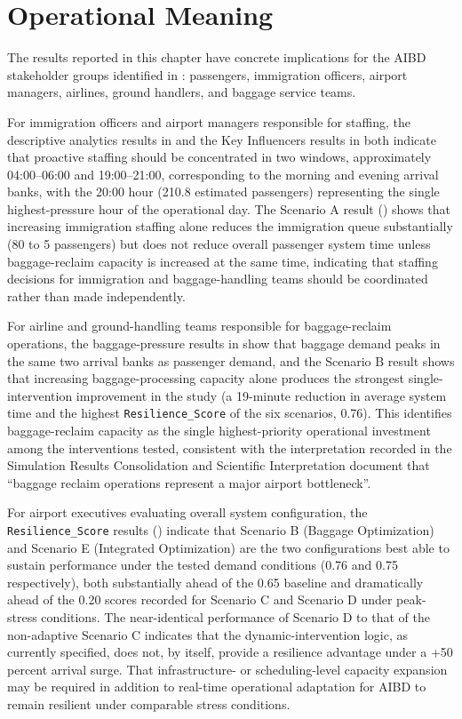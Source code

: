\section{Operational Meaning}
\label{sec:operational-meaning}

The results reported in this chapter have concrete implications for the AIBD stakeholder groups identified in : passengers, immigration officers, airport managers, airlines, ground handlers, and baggage service teams.

For immigration officers and airport managers responsible for staffing, the descriptive analytics results in  and the Key Influencers results in  both indicate that proactive staffing should be concentrated in two windows, approximately 04:00--06:00 and 19:00--21:00, corresponding to the morning and evening arrival banks, with the 20:00 hour (210.8 estimated passengers) representing the single highest-pressure hour of the operational day. The Scenario A result () shows that increasing immigration staffing alone reduces the immigration queue substantially (80 to 5 passengers) but does not reduce overall passenger system time unless baggage-reclaim capacity is increased at the same time, indicating that staffing decisions for immigration and baggage-handling teams should be coordinated rather than made independently.

For airline and ground-handling teams responsible for baggage-reclaim operations, the baggage-pressure results in  show that baggage demand peaks in the same two arrival banks as passenger demand, and the Scenario B result shows that increasing baggage-processing capacity alone produces the strongest single-intervention improvement in the study (a 19-minute reduction in average system time and the highest \nolinkurl{Resilience_Score} of the six scenarios, 0.76). This identifies baggage-reclaim capacity as the single highest-priority operational investment among the interventions tested, consistent with the interpretation recorded in the Simulation Results Consolidation and Scientific Interpretation document that ``baggage reclaim operations represent a major airport bottleneck''.

For airport executives evaluating overall system configuration, the \nolinkurl{Resilience_Score} results () indicate that Scenario B (Baggage Optimization) and Scenario E (Integrated Optimization) are the two configurations best able to sustain performance under the tested demand conditions (0.76 and 0.75 respectively), both substantially ahead of the 0.65 baseline and dramatically ahead of the 0.20 scores recorded for Scenario C and Scenario D under peak-stress conditions. The near-identical performance of Scenario D to that of the non-adaptive Scenario C indicates that the dynamic-intervention logic, as currently specified, does not, by itself, provide a resilience advantage under a +50 percent arrival surge. That infrastructure- or scheduling-level capacity expansion may be required in addition to real-time operational adaptation for AIBD to remain resilient under comparable stress conditions.

